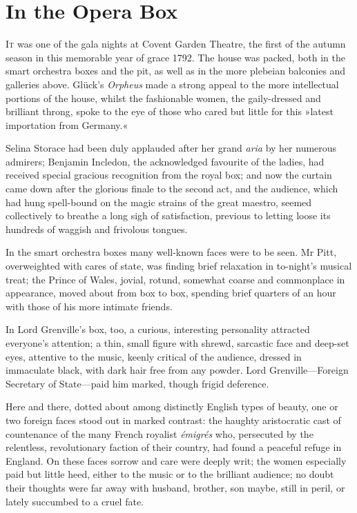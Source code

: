 
\chapter{In the Opera Box}
\lettrine[lines=4]{I}{t} was one of the gala nights at Covent Garden Theatre, the first of the autumn season in this memorable year of grace 1792. The house was packed, both in the smart orchestra boxes and the pit, as well as in the more plebeian balconies and galleries above. Glück's \textit{Orpheus} made a strong appeal to the more intellectual portions of the house, whilst the fashionable women, the gaily-dressed and brilliant throng, spoke to the eye of those who cared but little for this »latest importation from Germany.«

Selina Storace had been duly applauded after her grand \textit{aria} by her numerous admirers; Benjamin Incledon, the acknowledged favourite of the ladies, had received special gracious recognition from the royal box; and now the curtain came down after the glorious finale to the second act, and the audience, which had hung spell-bound on the magic strains of the great maestro, seemed collectively to breathe a long sigh of satisfaction, previous to letting loose its hundreds of waggish and frivolous tongues.

In the smart orchestra boxes many well-known faces were to be seen. Mr Pitt, overweighted with cares of state, was finding brief relaxation in to-night's musical treat; the Prince of Wales, jovial, rotund, somewhat coarse and commonplace in appearance, moved about from box to box, spending brief quarters of an hour with those of his more intimate friends.

In Lord Grenville's box, too, a curious, interesting personality attracted everyone's attention; a thin, small figure with shrewd, sarcastic face and deep-set eyes, attentive to the music, keenly critical of the audience, dressed in immaculate black, with dark hair free from any powder. Lord Grenville\allowbreak---\allowbreak Foreign Secretary of State\allowbreak---\allowbreak paid him marked, though frigid deference.

Here and there, dotted about among distinctly English types of beauty, one or two foreign faces stood out in marked contrast: the haughty aristocratic cast of countenance of the many French royalist \textit{émigrés} who, persecuted by the relentless, revolutionary faction of their country, had found a peaceful refuge in England. On these faces sorrow and care were deeply writ; the women especially paid but little heed, either to the music or to the brilliant audience; no doubt their thoughts were far away with husband, brother, son maybe, still in peril, or lately succumbed to a cruel fate.

